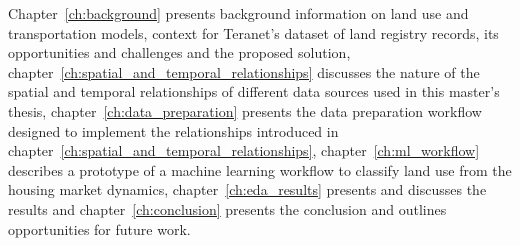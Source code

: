 Chapter~\ref{ch:background} presents background information on land use and transportation models, context for Teranet's dataset of land registry records, its opportunities and challenges and the proposed solution, chapter~\ref{ch:spatial_and_temporal_relationships} discusses the nature of the spatial and temporal relationships of different data sources used in this master's thesis, chapter~\ref{ch:data_preparation} presents the data preparation workflow designed to implement the relationships introduced in chapter~\ref{ch:spatial_and_temporal_relationships}, chapter~\ref{ch:ml_workflow} describes a prototype of a machine learning workflow to classify land use from the housing market dynamics, chapter~\ref{ch:eda_results} presents and discusses the results and chapter~\ref{ch:conclusion} presents the conclusion and outlines opportunities for future work.
